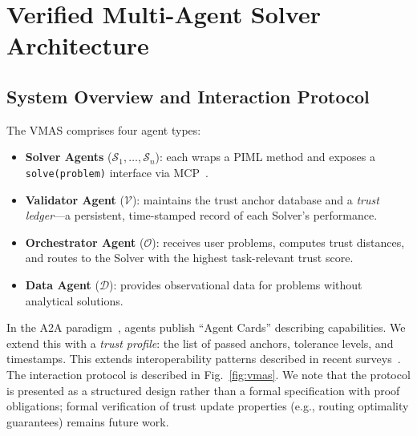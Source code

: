 \documentclass[conference]{IEEEtran}
\begin{document}
\section{Verified Multi-Agent Solver Architecture}
\label{sec:architecture}

\subsection{System Overview and Interaction Protocol}

The VMAS comprises four agent types:
\begin{itemize}
    \item \textbf{Solver Agents} ($\mathcal{S}_1,\ldots,\mathcal{S}_n$): each wraps a PIML method and exposes a \texttt{solve(problem)} interface via MCP~\cite{MCP2024}.
    \item \textbf{Validator Agent} ($\mathcal{V}$): maintains the trust anchor database and a \emph{trust ledger}---a persistent, time-stamped record of each Solver's performance.
    \item \textbf{Orchestrator Agent} ($\mathcal{O}$): receives user problems, computes trust distances, and routes to the Solver with the highest task-relevant trust score.
    \item \textbf{Data Agent} ($\mathcal{D}$): provides observational data for problems without analytical solutions.
\end{itemize}

In the A2A paradigm~\cite{A2A2025}, agents publish ``Agent Cards'' describing capabilities. We extend this with a \emph{trust profile}: the list of passed anchors, tolerance levels, and timestamps. This extends interoperability patterns described in recent surveys~\cite{Ferrag2025,Wang2024agents}. The interaction protocol is described in Fig.~\ref{fig:vmas}. We note that the protocol is presented as a structured design rather than a formal specification with proof obligations; formal verification of trust update properties (e.g., routing optimality guarantees) remains future work.
\end{document}
